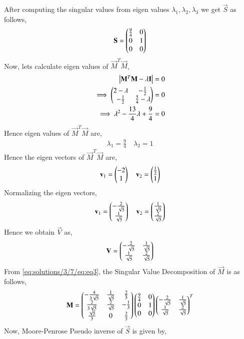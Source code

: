 After computing the singular values from eigen values $\lambda_1, \lambda_2, \lambda_3$ we get $\vec{S}$ as follows,
\begin{align}
\mathbf{S}=\begin{pmatrix}\frac{9}{4}&0\\0&1\\0&0\end{pmatrix}
\end{align}
Now, lets calculate eigen values of $\vec{M}^T\vec{M}$,
\begin{align}
\begin{vmatrix}\mathbf{M}^T\mathbf{M} - \lambda\mathbf{I}\end{vmatrix} &= 0\\
\implies\begin{pmatrix}2-\lambda&-\frac{1}{2}\\-\frac{1}{2}&\frac{5}{4}-\lambda\end{pmatrix} &=0\\
\implies\lambda^2-\frac{13}{4}\lambda+\frac{9}{4} &=0
\end{align}
Hence eigen values of $\vec{M}^T\vec{M}$ are,
\begin{align}
\lambda_1 = \frac{9}{4}\quad
\lambda_2 = 1
\end{align}
Hence the eigen vectors of $\vec{M}^T\vec{M}$ are,
\begin{align}
\mathbf{v}_1=\begin{pmatrix}-2\\1\end{pmatrix} \quad
\mathbf{v}_2=\begin{pmatrix}\frac{1}{2}\\1\end{pmatrix}
\end{align}
Normalizing the eigen vectors,
\begin{align}
\mathbf{v}_1=\begin{pmatrix}-\frac{2}{\sqrt{5}}\\\frac{1}{\sqrt{5}}\end{pmatrix} \quad
\mathbf{v}_2=\begin{pmatrix}\frac{1}{\sqrt{5}}\\\frac{2}{\sqrt{5}}\end{pmatrix}
\end{align}
Hence we obtain $\vec{V}$ as,
\begin{align}
\mathbf{V}=\begin{pmatrix}-\frac{2}{\sqrt{5}}&\frac{1}{\sqrt{5}}\\\frac{1}{\sqrt{5}}&\frac{2}{\sqrt{5}}\end{pmatrix}
\end{align}
From \eqref{eq:solutions/3/7/eq:eq3}, the Singular Value Decomposition of $\vec{M}$ is as follows,
\begin{align}
\mathbf{M} = \begin{pmatrix}-\frac{4}{3\sqrt{5}}&\frac{1}{\sqrt{5}}&\frac{2}{3}\\\frac{2}{3\sqrt{5}}&\frac{2}{\sqrt{5}}&-\frac{1}{3}\\\frac{\sqrt{5}}{3}&0&\frac{2}{3}\end{pmatrix}\begin{pmatrix}\frac{9}{4}&0\\0&1\\0&0\end{pmatrix}\begin{pmatrix}-\frac{2}{\sqrt{5}}&\frac{1}{\sqrt{5}}\\\frac{1}{\sqrt{5}}&\frac{2}{\sqrt{5}}\end{pmatrix}^T
\end{align}
Now, Moore-Penrose Pseudo inverse of $\vec{S}$ is given by,
